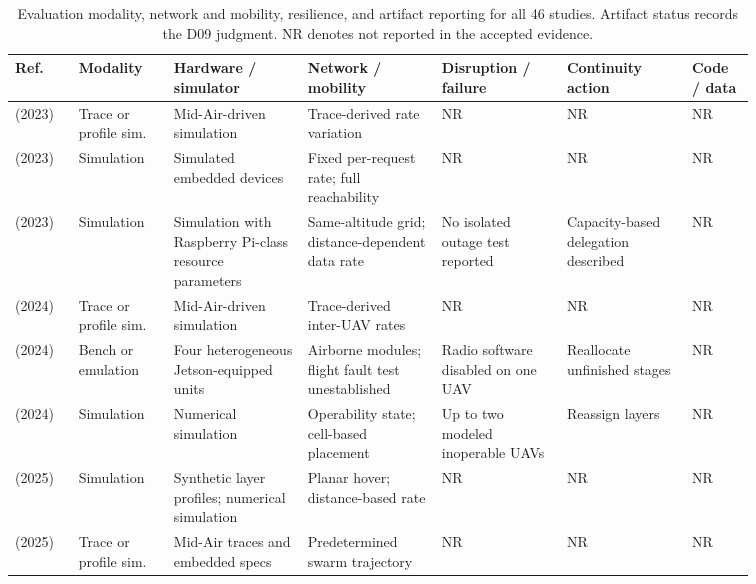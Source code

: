 \begin{table}[!tp]
\caption{Evaluation modality, network and mobility, resilience, and artifact reporting for all 46 studies. Artifact status records the D09 judgment. NR denotes not reported in the accepted evidence.}\label{tab:evaluation}
\centering
\fontsize{8}{10}\selectfont\setlength{\tabcolsep}{2.5pt}\renewcommand{\arraystretch}{1.08}
\begin{tabular}{@{}Y{0.0705\linewidth}Y{0.1090\linewidth}Y{0.1598\linewidth}Y{0.1532\linewidth}Y{0.1466\linewidth}Y{0.1438\linewidth}Y{0.0724\linewidth}@{}}
\toprule
Ref. & Modality & Hardware / simulator & Network / mobility & Disruption / failure & Continuity action & Code / data \\
\midrule
\cite{R0003}\newline\mbox{(2023)} & Trace or profile sim. & Mid-Air-driven simulation & Trace-derived rate variation & NR & NR & NR \\
\cite{R0015}\newline\mbox{(2023)} & Simulation & Simulated embedded devices & Fixed per-request rate; full reachability & NR & NR & NR \\
\cite{R0082}\newline\mbox{(2023)} & Simulation & Simulation with Raspberry Pi-class resource parameters & Same-altitude grid; distance-dependent data rate & No isolated outage test reported & Capacity-based delegation described & NR \\
\cite{R0010}\newline\mbox{(2024)} & Trace or profile sim. & Mid-Air-driven simulation & Trace-derived inter-UAV rates & NR & NR & NR \\
\cite{R0062}\newline\mbox{(2024)} & Bench or emulation & Four heterogeneous Jetson-equipped units & Airborne modules; flight fault test unestablished & Radio software disabled on one UAV & Reallocate unfinished stages & NR \\
\cite{R0073}\newline\mbox{(2024)} & Simulation & Numerical simulation & Operability state; cell-based placement & Up to two modeled inoperable UAVs & Reassign layers & NR \\
\cite{R0006}\newline\mbox{(2025)} & Simulation & Synthetic layer profiles; numerical simulation & Planar hover; distance-based rate & NR & NR & NR \\
\cite{R0059}\newline\mbox{(2025)} & Trace or profile sim. & Mid-Air traces and embedded specs & Predetermined swarm trajectory & NR & NR & NR \\

\end{tabular}
\end{table}
